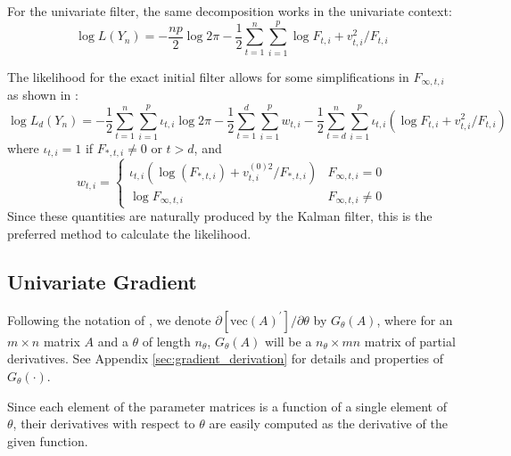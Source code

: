 \documentclass[12pt]{article}
\newcommand{\Gt}{G_\theta}
\newcommand{\vecop}[0]{\text{vec}}
\begin{document}
	For the univariate filter, the same decomposition works in the univariate context:
	\begin{equation} \label{eq:likelihood_uni}
	\log L(Y_n) = -\frac{np}{2} \log 2\pi - \frac{1}{2} \sum_{t=1}^n \sum_{i=1}^p\log F_{t,i}+ v_{t,i}^2 / F_{t,i} 
	\end{equation}
	
	The likelihood for the exact initial filter allows for some simplifications in $F_{\infty,t,i}$ as shown in \cite{dk_book}:
	\begin{equation} \label{eq:likelihood_uni_diff}
	\log L_d(Y_n) = -\frac{1}{2} \sum_{t=1}^n \sum_{i=1}^p \iota_{t,i} \log 2\pi  - \frac{1}{2}  \sum_{t=1}^d \sum_{i=1}^p w_{t,i} - \frac{1}{2} \sum_{t=d}^n \sum_{i=1}^p \iota_{t,i} \left(\log F_{t,i}+ v_{t,i}^2 / F_{t,i} \right)
	\end{equation}
	where  $\iota_{t,i} = 1$ if $F_{*,t,i} \neq 0$ or $ t > d$, and 
	\begin{equation*}
	w_{t,i} = \begin{cases} 
	   \iota_{t,i} (\log (F_{*,t,i}) + v_{t,i}^{(0)2} / F_{*,t,i}) & F_{\infty,t,i} = 0 \\
	   \log F_{\infty,t,i} & F_{\infty,t,i} \neq 0
	\end{cases} 
	\end{equation*}
	Since these quantities are naturally produced by the Kalman filter, this is the preferred method to calculate the likelihood.

\subsection*{Univariate Gradient}
	Following the notation of \cite{nagakura}, we denote $\partial \left[ \vecop(A)^\prime \right] / \partial \theta$ by $\Gt(A)$, where for an $m \times n$ matrix $A$ and a $\theta$ of length $n_\theta$, $\Gt(A)$ will be a $n_\theta \times mn$ matrix of partial derivatives. See Appendix \ref{sec:gradient_derivation} for details and properties of $\Gt(\cdot)$.

	Since each element of the parameter matrices is a function of a single element of $\theta$, their derivatives with respect to $\theta$ are easily computed as the derivative of the given function.
\end{document}
